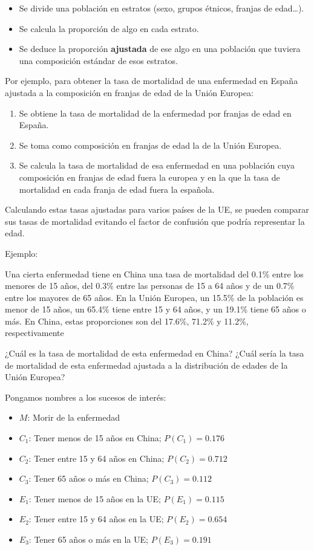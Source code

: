 \documentclass[
  spanish,
  letterpaper,
  DIV=11,
  numbers=noendperiod]{scrreprt}
\providecommand{\tightlist}{%
  \setlength{\itemsep}{0pt}\setlength{\parskip}{0pt}}
\begin{document}
\begin{tcolorbox}
\begin{itemize}
\tightlist
\item
  Se divide una población en estratos (sexo, grupos étnicos, franjas de
  edad\ldots).
\item
  Se calcula la proporción de algo en cada estrato.
\item
  Se deduce la proporción \textbf{ajustada} de ese algo en una población
  que tuviera una composición estándar de esos estratos.
\end{itemize}

Por ejemplo, para obtener la tasa de mortalidad de una enfermedad en
España ajustada a la composición en franjas de edad de la Unión Europea:

\begin{enumerate}
\def\labelenumi{\arabic{enumi}.}
\item
  Se obtiene la tasa de mortalidad de la enfermedad por franjas de edad
  en España.
\item
  Se toma como composición en franjas de edad la de la Unión Europea.
\item
  Se calcula la tasa de mortalidad de esa enfermedad en una población
  cuya composición en franjas de edad fuera la europea y en la que la
  tasa de mortalidad en cada franja de edad fuera la española.
\end{enumerate}

Calculando estas tasas ajustadas para varios países de la UE, se pueden
comparar sus tasas de mortalidad evitando el factor de confusión que
podría representar la edad.

Ejemplo:

Una cierta enfermedad tiene en China una tasa de mortalidad del 0.1\%
entre los menores de 15 años, del 0.3\% entre las personas de 15 a 64
años y de un 0.7\% entre los mayores de 65 años. En la Unión Europea, un
15.5\% de la población es menor de 15 años, un 65.4\% tiene entre 15 y
64 años, y un 19.1\% tiene 65 años o más. En China, estas proporciones
son del 17.6\%, 71.2\% y 11.2\%, respectivamente

¿Cuál es la tasa de mortalidad de esta enfermedad en China? ¿Cuál sería
la tasa de mortalidad de esta enfermedad ajustada a la distribución de
edades de la Unión Europea?

Pongamos nombres a los sucesos de interés:

\begin{itemize}
\item
  \(M\): Morir de la enfermedad
\item
  \(C_1\): Tener menos de 15 años en China; \(P(C_1)=0.176\)
\item
  \(C_2\): Tener entre 15 y 64 años en China; \(P(C_2)=0.712\)
\item
  \(C_3\): Tener 65 años o más en China; \(P(C_3)=0.112\)
\item
  \(E_1\): Tener menos de 15 años en la UE; \(P(E_1)=0.115\)
\item
  \(E_2\): Tener entre 15 y 64 años en la UE; \(P(E_2)=0.654\)
\item
  \(E_3\): Tener 65 años o más en la UE; \(P(E_3)=0.191\)
\end{itemize}


\end{tcolorbox}
\end{document}
